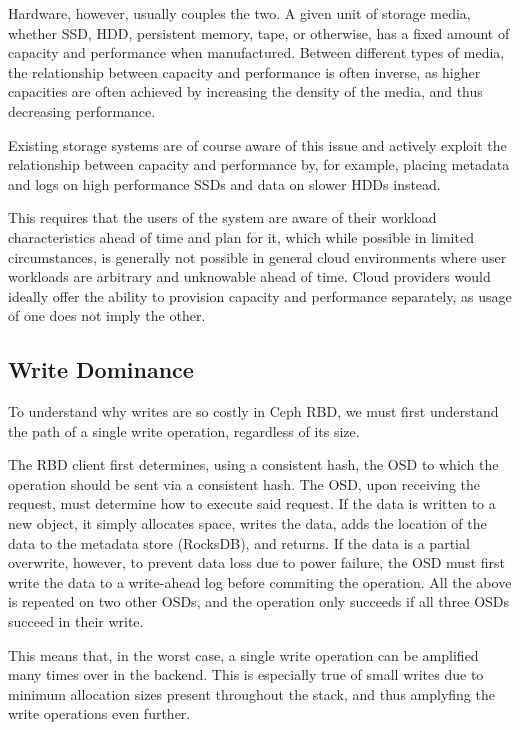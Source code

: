 Hardware, however, usually couples the two. A given unit of storage media,
whether SSD, HDD, persistent memory, tape, or otherwise, has a fixed amount of
capacity and performance when manufactured. Between different types of media,
the relationship between capacity and performance is often inverse, as higher
capacities are often achieved by increasing the density of the media, and thus
decreasing performance.

Existing storage systems are of course aware of this issue and actively exploit
the relationship between capacity and performance by, for example, placing
metadata and logs on high performance SSDs and data on slower HDDs instead.

This requires that the users of the system are aware of their workload
characteristics ahead of time and plan for it, which while possible in limited
circumstances, is generally not possible in general cloud environments where
user workloads are arbitrary and unknowable ahead of time. Cloud providers would
ideally offer the ability to provision capacity and performance separately, as
usage of one does not imply the other.


\subsection{Write Dominance}

To understand why writes are so costly in Ceph RBD, we must first understand
the path of a single write operation, regardless of its size.

The RBD client first determines, using a consistent hash, the OSD to which the
operation should be sent via a consistent hash. The OSD, upon receiving the
request, must determine how to execute said request. If the data is written to a
new object, it simply allocates space, writes the data, adds the location of the
data to the metadata store (RocksDB), and returns. If the data is a partial
overwrite, however, to prevent data loss due to power failure, the OSD must
first write the data to a write-ahead log before commiting the operation. All
the above is repeated on two other OSDs, and the operation only succeeds if
all three OSDs succeed in their write.

This means that, in the worst case, a single write operation can be amplified
many times over in the backend. This is especially true of small writes due to
minimum allocation sizes present throughout the stack, and thus amplyfing the
write operations even further.

